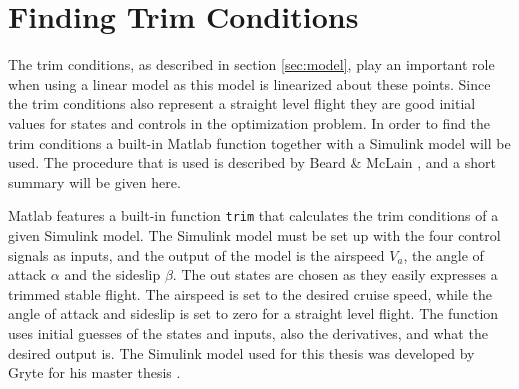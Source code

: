 \section[Trim Conditions]{Finding Trim Conditions}

The trim conditions, as described in section \ref{sec:model}, play an important role when using a linear model as this model is linearized about these points. Since the trim conditions also represent a straight level flight they are good initial values for states and controls in the optimization problem. In order to find the trim conditions a built-in Matlab function together with a Simulink model will be used. The procedure that is used is described by Beard \& McLain \cite{uavBEARD}, and a short summary will be given here.

Matlab features a built-in function \texttt{trim} that calculates the trim conditions of a given Simulink model. The Simulink model must be set up with the four control signals as inputs, and the output of the model is the airspeed $V_a$, the angle of attack $\alpha$ and the sideslip $\beta$. The out states are chosen as they easily expresses a trimmed stable flight. The airspeed is set to the desired cruise speed, while the angle of attack and sideslip is set to zero for a straight level flight. The function uses initial guesses of the states and inputs, also the derivatives, and what the desired output is. The Simulink model used for this thesis was developed by Gryte for his master thesis \cite{GRYTE}.